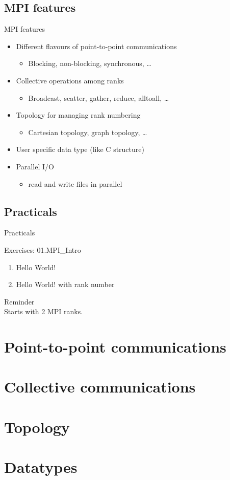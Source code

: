 \documentclass[aspectratio=43]{beamer}
\begin{document}
\subsection{MPI features}
\begin{frame}{MPI features}
\begin{itemize}
    \item Different flavours of point-to-point communications
    \begin{itemize}
        \item Blocking, non-blocking, synchronous, \ldots
    \end{itemize}
    \item Collective operations among ranks
    \begin{itemize}
        \item Broadcast, scatter, gather, reduce, alltoall, \ldots
    \end{itemize}
    \item Topology for managing rank numbering
    \begin{itemize}
        \item Cartesian topology, graph topology, \ldots
    \end{itemize}
    \item User specific data type (like C structure)
    \item Parallel I/O
    \begin{itemize}
        \item read and write files in parallel
    \end{itemize}
\end{itemize}
\end{frame}

\subsection{Practicals}
\begin{frame}{Practicals}
    \begin{brown2block}{Exercises: 01.MPI\_Intro}
    \begin{enumerate}
    \item Hello World!
    \item Hello World! with rank number
    \end{enumerate}
    \end{brown2block}
    \begin{brown0block}{Reminder}
        \\
        Starts with 2 MPI ranks.
    \end{brown0block}
\end{frame}

\section{Point-to-point communications}
\section{Collective communications}
\section{Topology}
\section{Datatypes}

\end{document}
